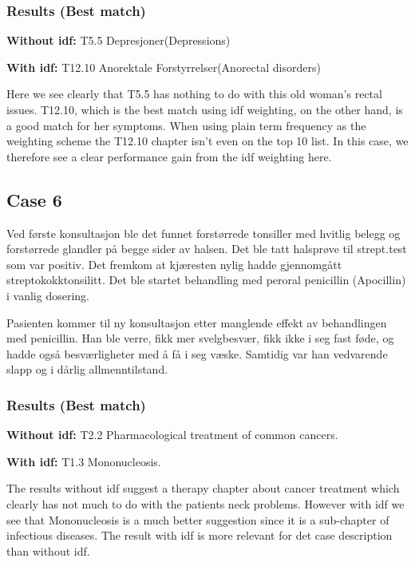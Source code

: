 \subsubsection{Results (Best match)}
\begin{description}
\item{\textbf{Without idf: }}T5.5 Depresjoner(Depressions)
\item{\textbf{With idf: }}T12.10 Anorektale Forstyrrelser(Anorectal disorders)
\end{description}

Here we see clearly that T5.5 has nothing to do with this old woman’s rectal issues. T12.10, which is the best match using idf weighting, on the other hand, is a good match for her symptoms. When using plain term frequency as the weighting scheme the T12.10 chapter isn’t even on the top 10 list. In this case, we therefore see a clear performance gain from the idf weighting here.

\subsection{Case 6}
Ved første konsultasjon ble det funnet forstørrede tonsiller med hvitlig belegg og forstørrede glandler på begge sider av halsen. Det ble tatt halsprøve til strept.test som var positiv. Det fremkom at kjæresten nylig hadde gjennomgått streptokokktonsilitt. Det ble startet behandling med peroral penicillin (Apocillin) i vanlig dosering.

Pasienten kommer til ny konsultasjon etter manglende effekt av behandlingen med penicillin. Han ble verre, fikk mer svelgbesvær, fikk ikke i seg fast føde, og hadde også besværligheter med å få i seg væske. Samtidig var han vedvarende slapp og i dårlig allmenntilstand.

\subsubsection{Results (Best match)}
\begin{description}
\item{\textbf{Without idf: }}T2.2 Pharmacological treatment of common cancers.
\item{\textbf{With idf: }}T1.3 Mononucleosis.
\end{description}
The results without idf suggest a therapy chapter about cancer treatment which clearly has not much to do with the patients neck problems. However with idf we see that Mononucleosis is a much better suggestion since it is a sub-chapter of infectious diseases. The result with idf is more relevant for det case description than without idf.